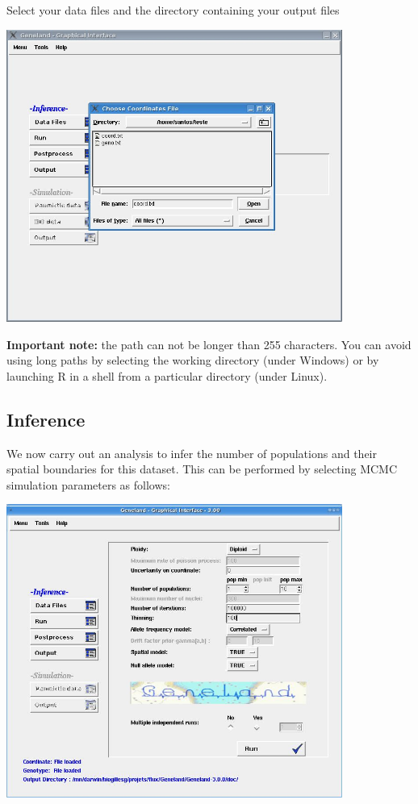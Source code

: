 \documentclass[a4paper,10pt]{article}
\begin{document}
\bigskip

Select  your data files and the directory containing your output files\\

\centerline{\includegraphics[width=11cm]{./fig/choosefiles.jpg}}


{\bf Important note:} the path can not be longer than 255 characters. 
You can avoid using long paths by selecting the working directory (under Windows) or by launching R in a  shell from 
a particular directory (under Linux). 

\subsection{Inference}

We now carry out an analysis to infer the number of populations and their spatial boundaries for this dataset.
This can be performed by selecting MCMC simulation parameters as follows:\\

\centerline{\includegraphics[width=11cm]{./fig/MCMC.jpg}}
\end{document}
